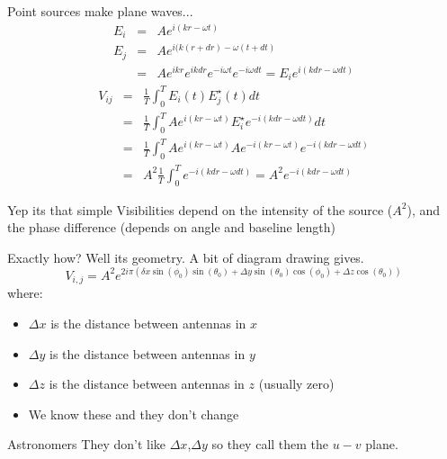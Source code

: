 \documentclass[ignorenonframetext]{beamer}
\begin{document}
\begin{frame}
Point sources make plane waves...
 \begin{eqnarray*}
E_i & = & A e^{i (k r - \omega t)} \\
E_j & = & A e^{i (k (r + dr) - \omega (t+dt)} \\
    & = & A e^{ikr} e^{ik d r} e^{-i \omega t}e^{-i \omega d t} = E_i e^{i (k dr - \omega dt)}
 \end{eqnarray*}
 \begin{eqnarray*}
  V_{ij} & = & \frac{1}{T} \int_0^T E_i(t) E_j^{\star}(t) dt \\
   & = & \frac{1}{T} \int_0^T A e^{i (k r - \omega t)} E_i^{\star} e^{-i (k dr - \omega dt)} dt \\
   & = & \frac{1}{T} \int_0^T A e^{i (k r - \omega t)} A e^{-i (k r - \omega t)}  e^{-i (k dr - \omega dt)} \\
   & = & A^2 \frac{1}{T} \int_0^T e^{-i (k dr - \omega dt)} = A^2 e^{-i (k dr - \omega dt)}
 \end{eqnarray*}
 \begin{block}{Yep its that simple}
  Visibilities depend on the intensity of the source ($A^2$), and the phase difference (depends on angle and baseline length)
 \end{block}
\end{frame}

\begin{frame}{Exactly how?}
Well its geometry. A bit of diagram drawing gives.
 \[ V_{i,j} = A^2 e^{2 i \pi \left(\delta x \sin{\left(\phi_{0} \right)} \sin{\left(\theta_{0} \right)} + \Delta y \sin{\left(\theta_{0} \right)} \cos{\left(\phi_{0} \right)} + \Delta z \cos{\left(\theta_{0} \right)}\right)}  \]
 where:
 \begin{itemize}
  \item $\Delta x$ is the distance between antennas in $x$
  \item $\Delta y$ is the distance between antennas in $y$
  \item $\Delta z$ is the distance between antennas in $z$ (usually zero)
  \item We know these and they don't change
 \end{itemize}
 \begin{block}{Astronomers}
  They don't like $\Delta x$,$\Delta y$ so they call them the $u-v$ plane.
 \end{block}
\end{frame}
\end{document}
